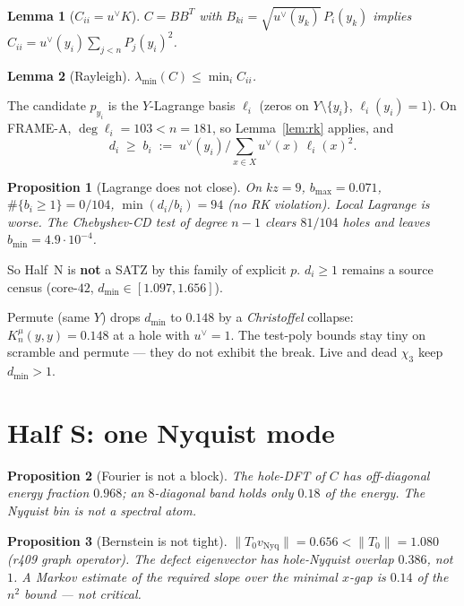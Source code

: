 \documentclass[11pt]{article}
\newtheorem{lemma}{Lemma}
\newtheorem{prop}{Proposition}
\theoremstyle{remark}
\begin{document}
\begin{lemma}[$C_{ii}=u^\vee K$]\label{lem:cii}
$C=BB^T$ with $B_{ki}=\sqrt{u^\vee(y_k)}\,P_i(y_k)$ implies
$C_{ii}=u^\vee(y_i)\sum_{j<n}P_j(y_i)^2$.
\end{lemma}

\begin{lemma}[Rayleigh]\label{lem:rayleigh}
$\lambda_{\min}(C)\le\min_i C_{ii}$.
\end{lemma}

The candidate $p_{y_i}$ is the $Y$-Lagrange basis
$\ell_i$ (zeros on $Y\setminus\{y_i\}$, $\ell_i(y_i)=1$).
On FRAME-A, $\deg\ell_i=103<n=181$, so
Lemma~\ref{lem:rk} applies, and
\[
  d_i \;\ge\; b_i
  \;:=\; u^\vee(y_i)\big/\textstyle\sum_{x\in X}u^\vee(x)\,\ell_i(x)^2.
\]

\begin{prop}[Lagrange does not close]\label{prop:lag}
On $kz=9$, $b_{\max}=0.071$, $\#\{b_i\ge 1\}=0/104$,
$\min(d_i/b_i)=94$ (no RK violation).
Local Lagrange is worse.
The Chebyshev-CD test of degree $n-1$ clears $81/104$
holes and leaves $b_{\min}=4.9\cdot 10^{-4}$.
\end{prop}

So Half~N is \textbf{not} a SATZ by this family of explicit
$p$.  $d_i\ge 1$ remains a source census (core-$42$,
$d_{\min}\in[1.097,1.656]$).

Permute (same $Y$) drops $d_{\min}$ to $0.148$ by a
\emph{Christoffel} collapse: $K_n^\mu(y,y)=0.148$ at a hole
with $u^\vee=1$.  The test-poly bounds stay tiny on
scramble and permute --- they do not exhibit the break.
Live and dead $\chi_3$ keep $d_{\min}>1$.

\section{Half S: one Nyquist mode}

\begin{prop}[Fourier is not a block]\label{prop:ft}
The hole-DFT of $C$ has off-diagonal energy fraction
$0.968$; an $8$-diagonal band holds only $0.18$ of the
energy.  The Nyquist bin is not a spectral atom.
\end{prop}

\begin{prop}[Bernstein is not tight]\label{prop:bern}
$\|T_0 v_{\mathrm{Nyq}}\|=0.656<\|T_0\|=1.080$
(r409 graph operator).
The defect eigenvector has hole-Nyquist overlap $0.386$,
not $1$.
A Markov estimate of the required slope over the minimal
$x$-gap is $0.14$ of the $n^2$ bound --- not critical.
\end{prop}
\end{document}
